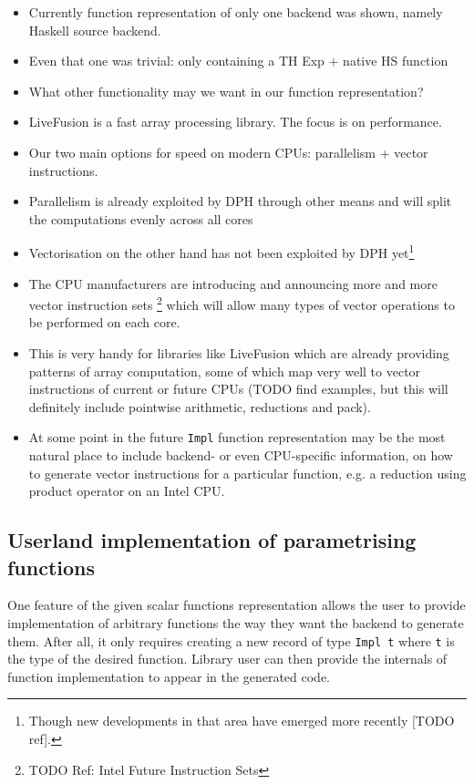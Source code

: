 \documentclass[preamble.tex]{subfiles}
\begin{document}
\begin{itemize}
\item Currently function representation of only one backend was shown, namely Haskell source backend.
\item Even that one was trivial: only containing a TH Exp + native HS function
\item What other functionality may we want in our function representation?
\item LiveFusion is a fast array processing library. The focus is on performance.
\item Our two main options for speed on modern CPUs: parallelism + vector instructions.
\item Parallelism is already exploited by DPH through other means and will split the computations evenly across all cores
\item Vectorisation on the other hand has not been exploited by DPH yet\footnote{Though new developments in that area have emerged more recently [TODO ref].}
\item The CPU manufacturers are introducing and announcing more and more vector instruction sets \footnote{TODO Ref: Intel Future Instruction Sets} which will allow many types of vector operations to be performed on each core.
\item This is very handy for libraries like LiveFusion which are already providing patterns of array computation, some of which map very well to vector instructions of current or future CPUs (TODO find examples, but this will definitely include pointwise arithmetic, reductions and pack).
\item At some point in the future \texttt{Impl} function representation may be the most natural place to include backend- or even CPU-specific information, on how to generate vector instructions for a particular function, e.g. a reduction using product operator on an Intel CPU.
\end{itemize}

\subsection{Userland implementation of parametrising functions}

One feature of the given scalar functions representation allows the user to provide implementation of arbitrary functions the way they want the backend to generate them. After all, it only requires creating a new record of type \texttt{Impl t} where \texttt{t} is the type of the desired function. Library user can then provide the internals of function implementation to appear in the generated code.
\end{document}
